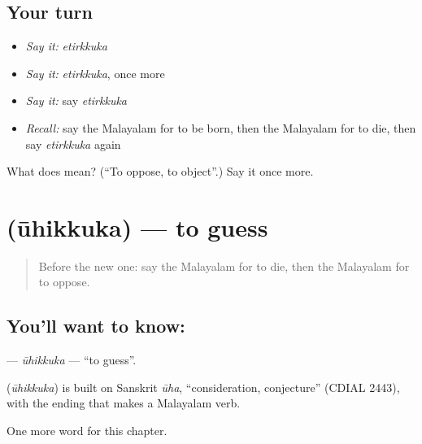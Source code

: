 \subsection*{Your turn}
\begin{itemize}
\raggedright
  \item \emph{Say it:} \emph{etirkkuka}
  \item \emph{Say it:} \emph{etirkkuka}, once more
  \item \emph{Say it:} say \emph{etirkkuka}
  \item \emph{Recall:} say the Malayalam for to be born, then the Malayalam for to die, then say \emph{etirkkuka} again
\end{itemize}

\begin{tcolorbox}[breakable,colback=teal!4,colframe=teal!35!black,title={Before you move on}]
What does  mean? (\textquotedblleft{}To oppose, to object\textquotedblright{}.) Say it once more.
\end{tcolorbox}
\section[\texorpdfstring{\ml{ഊഹിക്കുക} (ūhikkuka)}{ഊഹിക്കുക (ūhikkuka)}]{ (ūhikkuka) — to guess}

\label{lesson:ML-C270-uhikkuka}



\begin{quote}
Before the new one: say the Malayalam for to die, then the Malayalam for to oppose.
\end{quote}

\subsection*{You'll want to know: }
\textbf{} — \emph{ūhikkuka} — \textquotedblleft{}to guess\textquotedblright{}.

\begin{cousinweb}
\textbf{} (\emph{ūhikkuka}) is built on Sanskrit \emph{ūha}, \textquotedblleft{}consideration, conjecture\textquotedblright{} (CDIAL 2443), with the ending that makes a Malayalam verb.
\end{cousinweb}

\begin{grammarlens}[title={What you've built}]
One more word for this chapter.
\end{grammarlens}


